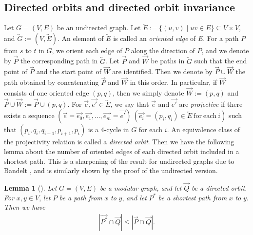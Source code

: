 \documentclass[11pt]{article}
\theoremstyle{definition}
\newtheorem{lemma}[theorem]{Lemma}
\begin{document}
\subsection{Directed orbits and directed orbit invariance}
Let $G=(V,E)$ be an undirected graph. Let $\overleftrightarrow{E}:=\{(u,v)\mid uv\in E\}\subseteq V\times V$, and $\overleftrightarrow{G}:=(V,\overleftrightarrow{E})$. An element of $\overleftrightarrow{E}$ is called an \textit{oriented edge} of $E$. For a path $P$ from $s$ to $t$ in $G$, we orient each edge of $P$ along the direction of $P$, and we denote by $\overrightarrow{P}$ the corresponding path in $\overleftrightarrow{G}$. Let $\overrightarrow{P}$ and $\overrightarrow{W}$ be paths in $\overleftrightarrow{G}$ such that the end point of $\overrightarrow{P}$ and the start point of $\overrightarrow{W}$ are identified. Then we denote by $\overrightarrow{P}\cup \overrightarrow{W}$ the path obtained by concatenating $\overrightarrow{P}$ and $\overrightarrow{W}$ in this order. In particular, if $\overrightarrow{W}$ consists of one oriented edge $(p,q)$, then we simply denote $\overrightarrow{W}:=(p,q)$ and $\overrightarrow{P}\cup \overrightarrow{W}:=\overrightarrow{P}\cup (p,q)$. For $\overrightarrow{e},\overrightarrow{e'}\in \overleftrightarrow{E}$, we say that $\overrightarrow{e}$ and $\overrightarrow{e'}$ are \textit{projective} if there exists a sequence $(\overrightarrow{e}= \overrightarrow{e_0}, \overrightarrow{e_1},...,\overrightarrow{e_m}=\overrightarrow{e'})\ (\overrightarrow{e_i}=(p_i,q_i)\in \overleftrightarrow{E}\ \mathrm{for\ each\ }i)$ such that
$(p_i,q_i,q_{i+1},p_{i+1},p_i)$ is a 4-cycle in $G$ for each $i$. An equivalence class of the projectivity relation is called a \textit{directed orbit}. Then we have the following lemma about the number of oriented edges of each directed orbit included in a shortest path. This is a sharpening of the result for undirected graphs due to Bandelt \cite{bandelt1985}, and is similarly shown by the proof of the undirected version.
\begin{lemma}[\cite{bandelt1985}]
\label{lemma:orbiteq}
\textit{Let} $G=(V,E)$ \textit{be a modular graph, and let }$\overrightarrow{Q}$ \textit{be a directed orbit. For} $x,y\in V$, \textit{let} $P$ \textit{be a path from} $x$ \textit{to} $y$, \textit{and let} $P^*$ \textit{be a shortest path from} $x$ \textit{to} $y$. \textit{Then we have}
\begin{align}
\label{orbiteq}
    |\overrightarrow{P^*}\cap \overrightarrow{Q}|\leq |\overrightarrow{P}\cap \overrightarrow{Q}|.
\end{align}
\end{lemma}
\end{document}
